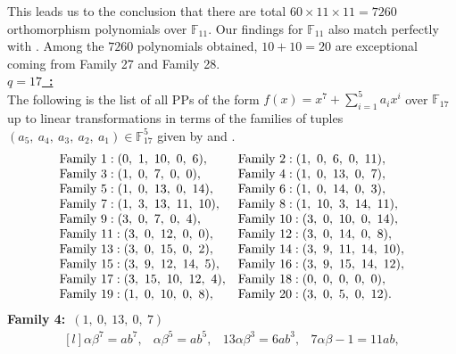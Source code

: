 \documentclass[12pt,a4wide, reqno]{amsart}
\theoremstyle{definition}
\theoremstyle{remark}
\numberwithin{equation}{section}
\begin{document}
    This leads us to the conclusion that there are total $60\times 11 \times 11 =7260$ orthomorphism polynomials over $\mathbb{F}_{11}.$ Our findings for $\mathbb{F}_{11}$ also match perfectly with \cite[Table~3.2]{shallue}. Among the $7260$ polynomials obtained, $10+10=20$ are exceptional coming from Family 27 and Family 28.
    \vspace{0.5 cm}\\
\underline{\Large \textbf{$q=17$~:}}
\vspace{0.2cm}\\
The following is the list of all PPs of the form $f(x)=x^7+\sum_{i=1}^{5}a_ix^i$ over $\mathbb{F}_{17}$ up to linear transformations in terms of the families of tuples $(a_5,~a_4,~a_3,~a_2,~a_1)\in\mathbb{F}_{17}^5$ given by  and .
\begin{equation*}
\begin{matrix*}[l]
     \textup{Family 1}:(0,~1,~10,~0,~6), & \textup{Family 2}:(1,~0,~6,~0,~11),\\
     \textup{Family 3}: (1,~0,~7,~0,~0),&\textup{Family 4}:(1,~0,~13,~0,~7), \\
     \textup{Family 5}:(1,~0,~13,~0,~14),& \textup{Family 6}: (1,~0,~14,~0,~3),\\
     \textup{Family 7}:(1,~3,~13,~11,~10),& \textup{Family 8}:(1,~10,~3,~14,~11),\\
 \textup{Family 9}:(3,~0,~7,~0,~4),&\textup{Family 10}:(3,~0,~10,~0,~14),\\
 \textup{Family 11}:(3,~0,~12,~0,~0), & \textup{Family 12}:(3,~0,~14,~0,~8),\\
 \textup{Family 13}:(3,~0,~15,~0,~2),& \textup{Family 14}:(3,~9,~11,~14,~10), \\
 \textup{Family 15}:(3,~9,~12,~14,~5), & \textup{Family 16}:(3,~9,~15,~14,~12),\\
 \textup{Family 17}:(3,~15,~10,~12,~4),& \textup{Family 18}:(0,~0,~0,~0,~0), \\
 \textup{Family 19}:(1,~0,~10,~0,~8),& \textup{Family 20}:(3,~0,~5,~0,~12). 
 
\end{matrix*}
\end{equation*}
\textbf{Family 4:}~$(1,~0,~13,~0,~7)$ 
\begin{equation}\label{eq58}
    \begin{matrix*}[l]
         \alpha \beta ^7=ab^7, & \alpha \beta ^5=ab^5, & 13\alpha \beta ^3=6ab ^3, & 7\alpha\beta-1=11ab,
    \end{matrix*}
\end{equation}
\end{document}
